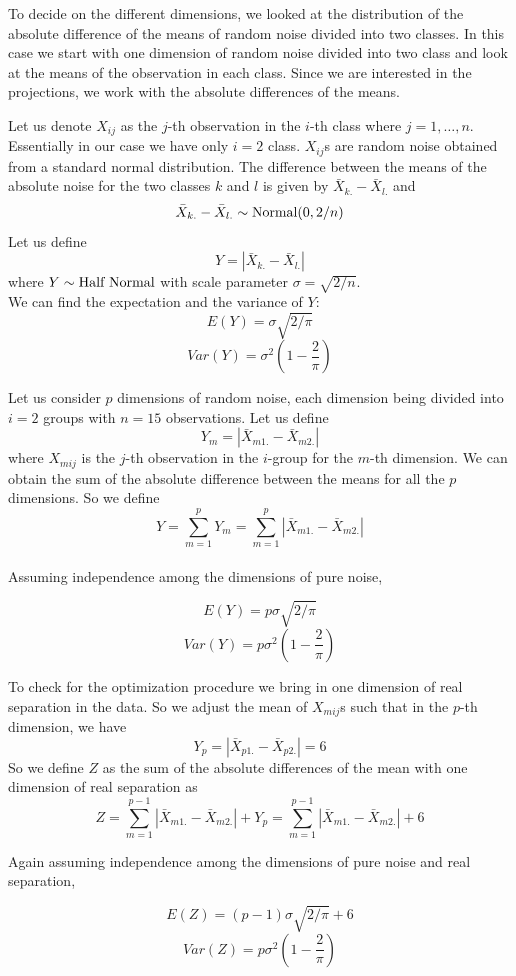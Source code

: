 \documentclass[12]{article}
\begin{document}
To decide on the different dimensions, we looked at the distribution of the absolute difference of the means of random noise divided into two classes. In this case we start with one dimension of random noise divided into two class and look at the means of the observation in each class. Since we are interested in the projections, we work with the absolute differences of the means.

Let us denote $X_{ij}$ as the $j$-th observation in the $i$-th class where $j = 1, \dots, n$. Essentially in our case we have only $i = 2$ class. $X_{ij}$s are random noise obtained from a standard normal distribution. The difference between the means of the absolute noise for the two classes $k$ and $l$ is given by $\bar{X}_{k.} - \bar{X}_{l.}$ and $$\bar{X}_{k.} - \bar{X}_{l.} \sim \hbox{Normal}(0, 2/n)$$ Let us define $$Y  = |\bar{X}_{k.} - \bar{X}_{l.}|$$ where $Y \sim \hbox{Half Normal}$ with scale parameter $ \sigma = \sqrt{2/n}$. \\

We can find the expectation and the variance of $Y$: 
$$E(Y) = \sigma \sqrt{2/\pi}$$
$$Var(Y) = \sigma^2 (1 - \frac{2}{\pi})$$

Let us consider $p$ dimensions of random noise, each dimension being divided into $i = 2$ groups with $n = 15$ observations. Let us define $$Y_m = |\bar{X}_{m1.} - \bar{X}_{m2.}|$$ where $X_{mij}$ is the $j$-th observation in the $i$-group for the $m$-th dimension. We can obtain the sum of the absolute difference between the means for all the $p$ dimensions. So we define $$Y = \sum_{m=1}^p Y_m = \sum_{m=1}^p |\bar{X}_{m1.} - \bar{X}_{m2.}| $$ \\

Assuming independence among the dimensions of pure noise,

$$E(Y) = p \sigma \sqrt{2/\pi}$$
$$Var(Y) = p \sigma^2 (1 - \frac{2}{\pi})$$

To check for the optimization procedure we bring in one dimension of real separation in the data. So we adjust the mean of $X_{mij}$s such that in the $p$-th dimension, we have $$Y_p = |\bar{X}_{p1.} - \bar{X}_{p2.}| = 6$$ So we define $Z$ as the sum of the absolute differences of the mean with one dimension of real separation as $$Z = \sum_{m=1}^{p-1} |\bar{X}_{m1.} - \bar{X}_{m2.}| + Y_p = \sum_{m=1}^{p-1} |\bar{X}_{m1.} - \bar{X}_{m2.}| + 6$$

Again assuming independence among the dimensions of pure noise and real separation,

$$E(Z) = (p - 1) \sigma \sqrt{2/\pi} + 6$$
$$Var(Z) = p \sigma^2 (1 - \frac{2}{\pi})$$
\end{document}
